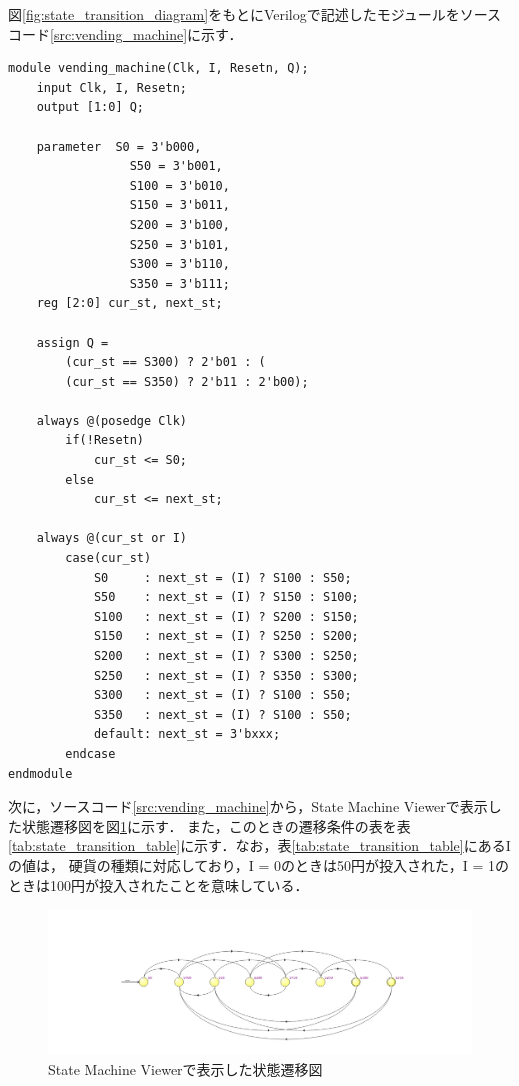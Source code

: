 \documentclass{jlreq}
\numberwithin{equation}{section}
\begin{document}
図\ref{fig:state_transition_diagram}をもとにVerilogで記述したモジュールをソースコード\ref{src:vending_machine}に示す．
\begin{lstlisting}[caption=状態遷移を行う自動販売機のモジュール, label=src:vending_machine]
module vending_machine(Clk, I, Resetn, Q);
	input Clk, I, Resetn;
	output [1:0] Q;
	
	parameter  S0 = 3'b000,
				 S50 = 3'b001,
				 S100 = 3'b010,
				 S150 = 3'b011,
				 S200 = 3'b100,
				 S250 = 3'b101,
				 S300 = 3'b110,
				 S350 = 3'b111; 
	reg [2:0] cur_st, next_st;
	
	assign Q = 
		(cur_st == S300) ? 2'b01 : (
		(cur_st == S350) ? 2'b11 : 2'b00);
				  
	always @(posedge Clk)
		if(!Resetn)
			cur_st <= S0;
		else
			cur_st <= next_st;
	
	always @(cur_st or I)
		case(cur_st)
			S0	   : next_st = (I) ? S100 : S50;
			S50    : next_st = (I) ? S150 : S100;
			S100   : next_st = (I) ? S200 : S150;
			S150   : next_st = (I) ? S250 : S200;
			S200   : next_st = (I) ? S300 : S250;
			S250   : next_st = (I) ? S350 : S300;
			S300   : next_st = (I) ? S100 : S50;
			S350   : next_st = (I) ? S100 : S50;
			default: next_st = 3'bxxx;
		endcase
endmodule
\end{lstlisting}

次に，ソースコード\ref{src:vending_machine}から，State Machine Viewerで表示した状態遷移図を図\ref{fig:state_machine_viewer_output}に示す．
また，このときの遷移条件の表を表\ref{tab:state_transition_table}に示す．なお，表\ref{tab:state_transition_table}にあるIの値は，
硬貨の種類に対応しており，I = 0のときは50円が投入された，I = 1のときは100円が投入されたことを意味している．
\begin{figure}[H]
	\centering
	\includegraphics[width=\textwidth]{assets/vending_machine_state_viewer.png}
	\caption{State Machine Viewerで表示した状態遷移図}
	\label{fig:state_machine_viewer_output}
\end{figure}
\end{document}
